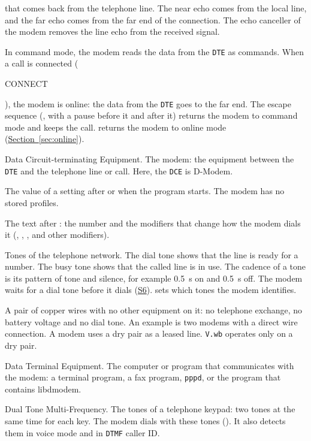 \documentclass[a5paper,10pt]{article}
\makeatletter
\newcommand{\cmd}[1]{\texttt{#1}}
\DeclareRobustCommand{\rc}[1]{{\setlength{\fboxsep}{1pt}%
  \colorbox{dmrc}{\ttfamily\color{dmnavy}\rule[-0.45ex]{0pt}{1.95ex}#1}}}
\newcommand{\cmdr}[1]{\textcolor{dmlink}{\cmd{#1}}}
\newcommand{\std}[1]{\texttt{#1}}
\newcommand{\stdb}[1]{\textpdfrender{TextRenderingMode=FillStroke,
  LineWidth=0.25pt}{\texttt{#1}}}
\newcommand{\cmdl}[2][]{\hyperlink{cmd:#1}{\cmd{#2}}}
\newcommand{\sreg}[1]{\hyperlink{sreg:#1}{S#1}}
\let\cmd\@firstofone
\makeatother
\begin{document}
\begin{description}[style=nextline,leftmargin=1.2em,font=\bfseries\color{dmnavy}]
  that comes back from the telephone line.  The near echo comes from the
  local line, and the far echo comes from the far end of the connection.
  The echo canceller of the modem removes the line echo from the received
  signal.
\item[Command mode and online mode] In command mode, the modem reads
  the data from the \std{DTE} as commands.  When a call is connected
  (\rc{CONNECT}), the modem is online: the data from the \std{DTE} goes
  to the far end.  The escape sequence (\cmdr{+++}, with a pause before
  it and after it) returns the modem to command mode and keeps the call.
  \cmdl[O]{ATO} returns the modem to online mode
  (\hyperref[sec:online]{Section~\ref*{sec:online}}).
\item[\stdb{DCE}] Data Circuit-terminating Equipment.  The modem: the
  equipment between the \std{DTE} and the telephone line or call.  Here,
  the \std{DCE} is D-Modem.
\item[Default] The value of a setting after \cmdl[Z]{ATZ} or when the
  program starts.  The modem has no stored profiles.
\item[Dial string] The text after \cmdl[D]{ATD}: the number and the
  modifiers that change how the modem dials it (\cmdl[D]{T},
  \cmdl[D]{P}, \cmdl[D]{W}, \cmdl[D]{,} and other modifiers).
\item[Dial tone, busy tone and cadence] Tones of the telephone network.  The
  dial tone shows that the line is ready for a number.  The busy tone
  shows that the called line is in use.  The cadence of a tone is its
  pattern of tone and silence, for example 0.5~s on and 0.5~s off.  The
  modem waits for a dial tone before it dials (\sreg{6}).
  \cmdl[X]{X} sets which tones the modem identifies.
\item[Dry pair] A pair of copper wires with no other equipment on it:
  no telephone exchange, no battery voltage and no dial tone.  An
  example is two modems with a direct wire connection.  A modem uses a
  dry pair as a leased line.  \std{V.wb} operates only on a dry pair.
\item[\stdb{DTE}] Data Terminal Equipment.  The computer or program that
  communicates with the modem: a terminal program, a fax program,
  \texttt{pppd}, or the program that contains libdmodem.
\item[\stdb{DTMF}] Dual Tone Multi-Frequency.  The tones of a telephone
  keypad: two tones at the same time for each key.  The modem dials with
  these tones (\cmdl[D]{T}).  It also detects them in voice mode and in
  \std{DTMF} caller ID.

\end{description}
\end{document}
